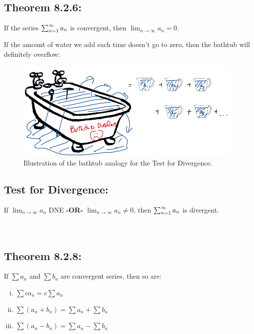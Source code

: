 \documentclass[10pt]{article}
\begin{document}
\subsection*{Theorem 8.2.6:}
If the series \(\sum_{n=1}^\infty a_n\) is convergent, then \(\lim_{n\rightarrow\infty} a_n = 0\).


If the amount of water we add each time doesn't go to zero, then the bathtub will definitely overflow:\\

\begin{figure}[h]
\includegraphics[width=.9\columnwidth]{Ch8s2-bath-div.png}
\caption{Illustration of the bathtub analogy for the Test for Divergence.}
\end{figure}

\subsection*{Test for Divergence:}
If \(\lim_{n\rightarrow\infty} a_n\) DNE \textbf{-OR-} \(\lim_{n\rightarrow\infty} a_n \neq 0\), then \(\sum_{n=1}^\infty a_n\) is  divergent.\\~\\~\\


\vspace*{.1in}


\subsection*{Theorem 8.2.8: }

%
If \(\sum a_n\) and \(\sum b_n\) are convergent series, then so are:
\begin{enumerate}[(i)]
\item \(\sum c a_n = c\sum a_n\)
\item \(\sum (a_n+ b_n) = \sum	a_n + \sum	b_n\)
\item \(\sum (a_n- b_n) = \sum	a_n - \sum	b_n\)
\end{enumerate}
\end{document}

